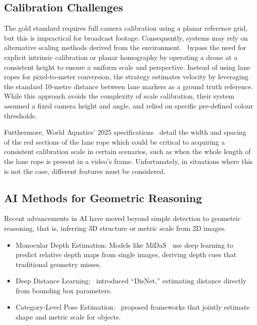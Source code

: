 \documentclass[conference]{IEEEtran}
\begin{document}
\subsection*{Calibration Challenges}
The gold standard requires full camera calibration using a planar reference grid, but this is impractical for broadcast footage. Consequently, systems may rely on alternative scaling methods derived from the environment.~\cite{tran2024} bypass the need for explicit intrinsic calibration or planar homography by operating a drone at a consistent height to ensure a uniform scale and perspective. Instead of using lane ropes for pixel-to-meter conversion, the strategy estimates velocity by leveraging the standard 10-metre distance between lane markers as a ground truth reference. While this approach avoids the complexity of scale calibration, their system assumed a fixed camera height and angle, and relied on specific pre-defined colour thresholds.

Furthermore, World Aquatics' 2025 specifications~\cite{FINA2025} detail the width and spacing of the red sections of the lane rope which could be critical to acquiring a consistent calibration scale in certain scenarios, such as when the whole length of the lane rope is present in a video's frame. Unfortunately, in situations where this is not the case, different features must be considered.

\subsection{AI Methods for Geometric Reasoning}

Recent advancements in AI have moved beyond simple detection to geometric reasoning, that is, inferring 3D structure or metric scale from 2D images.

\begin{itemize}
    \item Monocular Depth Estimation: Models like MiDaS~\cite{chauhan2025} use deep learning to predict relative depth maps from single images, deriving depth cues that traditional geometry misses.
    \item Deep Distance Learning:~\cite{haseeb2018} introduced ``DisNet,'' estimating distance directly from bounding box parameters.
    \item Category-Level Pose Estimation:~\cite{lee2021} proposed frameworks that jointly estimate shape and metric scale for objects.
\end{itemize}
\end{document}
